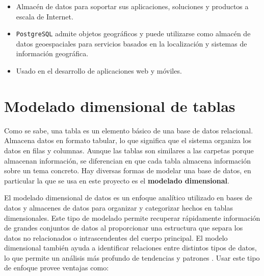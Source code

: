 \begin{itemize}
    \item Almacén de datos para soportar sus aplicaciones, soluciones y productos a escala de Internet.

    \item \texttt{PostgreSQL} admite objetos geográficos y puede utilizarse como almacén de datos geoespaciales para servicios basados en la localización y sistemas de información geográfica.

    \item Usado en el desarrollo de aplicaciones web y móviles.
\end{itemize}


\section{Modelado dimensional de tablas}

Como se sabe, una tabla es un elemento básico de una base de datos relacional. Almacena datos en formato tabular, lo que significa que el sistema organiza los datos en filas y columnas. Aunque las tablas son similares a las carpetas porque almacenan información, se diferencian en que cada tabla almacena información sobre un tema concreto.
Hay diversas formas de modelar una base de datos, en particular la que se usa en este proyecto es el \textbf{modelado dimensional}.

El modelado dimensional de datos es un enfoque analítico utilizado en bases de datos y almacenes de datos para organizar y categorizar hechos en tablas dimensionales. Este tipo de modelado permite recuperar rápidamente información de grandes conjuntos de datos al proporcionar una estructura que separa los datos no relacionados o intrascendentes del cuerpo principal. El modelo dimensional también ayuda a identificar relaciones entre distintos tipos de datos, lo que permite un análisis más profundo de tendencias y patrones \cite{kimball2002data}. 
Usar este tipo de enfoque provee ventajas como:

